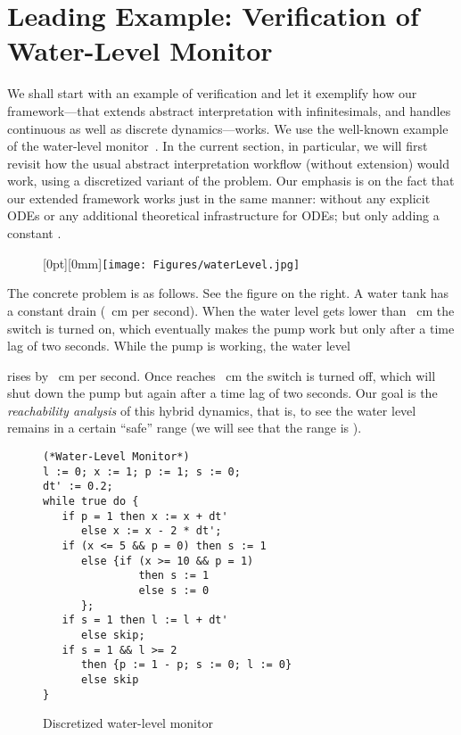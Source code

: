 \documentclass[envcountsect,orivec]{llncs} \pdfoutput=1
\theoremstyle{definition}
\begin{document}
\section{Leading Example: Verification of Water-Level Monitor}\label{sec:exampleOfAnalysis}
We shall start with an example of verification and let it exemplify how our
 framework---that extends abstract interpretation with infinitesimals,
 and handles continuous as well as discrete dynamics---works. We use the
 well-known example of the water-level monitor~\cite{Alur1992}.
In the current section, in particular, we will first revisit how the usual
 abstract interpretation workflow (without extension) would work, using
 a 
 discretized variant of the problem. Our emphasis is on the fact that
 our extended framework works just in the same manner: without any
 explicit ODEs or any additional theoretical infrastructure for ODEs;
 but only adding a constant .


\begin{wrapfigure}[4]{r}{0pt}
  \raisebox{-13mm}[0pt][0mm]{\texttt{[image: Figures/waterLevel.jpg]}}
\end{wrapfigure}
 The concrete problem is as follows.
 See the figure on the right.  A water tank has a
 constant drain (~cm per second). When the water level  gets lower
 than ~cm the 
 switch is turned on, which eventually makes the pump work but only after 
 a time lag of two seconds. While the pump is working, the water level
 
 rises by ~cm per second. Once  reaches ~cm the switch is
 turned off, which will shut down the pump but again after a time lag of two seconds.
 Our goal is the \emph{reachability analysis} of this hybrid dynamics,
 that is, to see the water level  remains in a certain ``safe'' range (we will see
 that the range is ).
 






\begin{wrapfigure}[13]{r}{0.5\hsize}
\vspace{-1em}
 \begingroup
 \fontsize{7pt}{8pt}\selectfont
  \begin{verbatim}
(*Water-Level Monitor*)
l := 0; x := 1; p := 1; s := 0; 
dt' := 0.2;  
while true do {
   if p = 1 then x := x + dt' 
      else x := x - 2 * dt';
   if (x <= 5 && p = 0) then s := 1 
      else {if (x >= 10 && p = 1) 
               then s := 1 
               else s := 0
      };
   if s = 1 then l := l + dt'
      else skip;
   if s = 1 && l >= 2
      then {p := 1 - p; s := 0; l := 0}
      else skip
}
\end{verbatim}
\endgroup 
\vspace{-1.7em}
\caption{Discretized water-level monitor}
\label{fig:whileCodeCaseStudy}
\end{wrapfigure}
\end{document}
